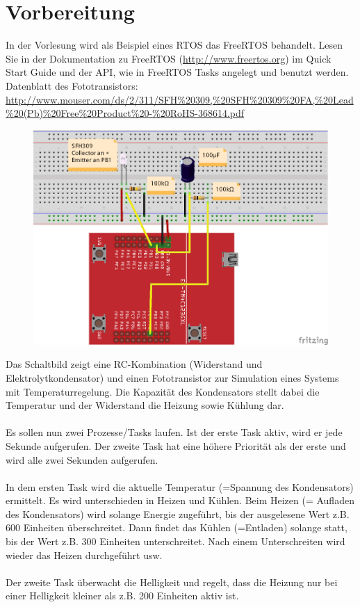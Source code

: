 \newpage
\section{Vorbereitung}
In der Vorlesung wird als Beispiel eines RTOS das FreeRTOS behandelt. Lesen Sie in der Dokumentation zu FreeRTOS (\url{http://www.freertos.org}) im Quick Start Guide und der API, wie in FreeRTOS Tasks angelegt und benutzt werden. Datenblatt des Fototransistors: \url{http://www.mouser.com/ds/2/311/SFH\%20309,\%20SFH\%20309\%20FA,\%20Lead\%20(Pb)\%20Free\%20Product\%20-\%20RoHS-368614.pdf}
\begin{figure}[h!]
	\centering
	\includegraphics[width=0.7\linewidth]{images/Schaltplan6}
\end{figure}

\noindent Das Schaltbild zeigt eine RC-Kombination (Widerstand und Elektrolytkondensator) und einen Fototransistor zur Simulation eines Systems mit Temperaturregelung. Die Kapazität des Kondensators stellt dabei die Temperatur und der Widerstand die Heizung sowie Kühlung dar.\\ \\
Es sollen nun zwei Prozesse/Tasks laufen. Ist der erste Task aktiv, wird er jede Sekunde aufgerufen. Der zweite Task hat eine höhere Priorität als der erste und wird alle zwei Sekunden aufgerufen.\\ \\
In dem ersten Task wird die aktuelle Temperatur (=Spannung des Kondensators) ermittelt. Es wird unterschieden in Heizen und Kühlen. Beim Heizen (= Aufladen des Kondensators) wird solange Energie zugeführt, bis der ausgelesene Wert z.B. 600 Einheiten überschreitet. Dann findet das Kühlen (=Entladen) solange statt, bis der Wert z.B. 300 Einheiten unterschreitet. Nach einem Unterschreiten wird wieder das Heizen durchgeführt usw.\\ \\
Der zweite Task überwacht die Helligkeit und regelt, dass die Heizung nur bei einer Helligkeit kleiner als z.B. 200 Einheiten aktiv ist.
